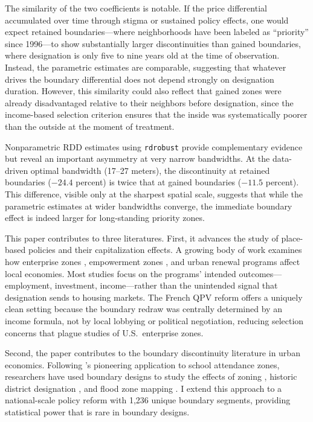 \documentclass[12pt]{article}
\begin{document}
The similarity of the two coefficients is notable. If the price differential accumulated over time through stigma or sustained policy effects, one would expect retained boundaries---where neighborhoods have been labeled as ``priority'' since 1996---to show substantially larger discontinuities than gained boundaries, where designation is only five to nine years old at the time of observation. Instead, the parametric estimates are comparable, suggesting that whatever drives the boundary differential does not depend strongly on designation duration. However, this similarity could also reflect that gained zones were already disadvantaged relative to their neighbors before designation, since the income-based selection criterion ensures that the inside was systematically poorer than the outside at the moment of treatment.

Nonparametric RDD estimates using \texttt{rdrobust} \citep{calonico2014robust} provide complementary evidence but reveal an important asymmetry at very narrow bandwidths. At the data-driven optimal bandwidth (17--27 meters), the discontinuity at retained boundaries ($-24.4$ percent) is twice that at gained boundaries ($-11.5$ percent). This difference, visible only at the sharpest spatial scale, suggests that while the parametric estimates at wider bandwidths converge, the immediate boundary effect is indeed larger for long-standing priority zones.

This paper contributes to three literatures. First, it advances the study of place-based policies and their capitalization effects. A growing body of work examines how enterprise zones \citep{busso2013assessing, neumark2015place}, empowerment zones \citep{hanson2009enterprise}, and urban renewal programs \citep{ahlfeldt2015direct} affect local economies. Most studies focus on the programs' intended outcomes---employment, investment, income---rather than the unintended signal that designation sends to housing markets. The French QPV reform offers a uniquely clean setting because the boundary redraw was centrally determined by an income formula, not by local lobbying or political negotiation, reducing selection concerns that plague studies of U.S.\ enterprise zones.

Second, the paper contributes to the boundary discontinuity literature in urban economics. Following \citet{black1999better}'s pioneering application to school attendance zones, researchers have used boundary designs to study the effects of zoning \citep{turner2014land}, historic district designation \citep{coulson2008historic}, and flood zone mapping \citep{gibson2019effects}. I extend this approach to a national-scale policy reform with 1,236 unique boundary segments, providing statistical power that is rare in boundary designs.
\end{document}
